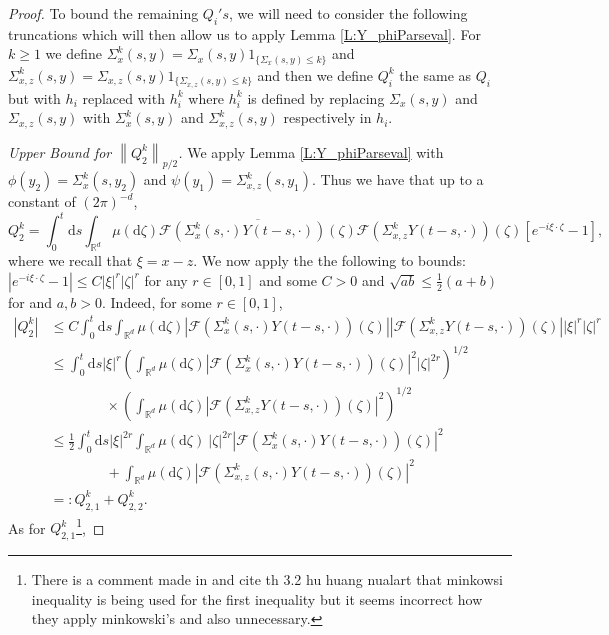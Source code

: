 \documentclass[a4paper,11pt]{article}
\numberwithin{equation}{section}
\theoremstyle{plain}
\theoremstyle{definition}
\newcommand{\ud}{\ensuremath{\mathrm{d} }}
\newcommand{\Norm}[1]{\left\|  #1   \right\|}
\newcommand{\R}{\mathbb{R}}
\numberwithin{NQ}{section}
\numberwithin{LQ}{section}
\numberwithin{ZQ}{section}
\begin{document}
\begin{proof}
To bound the remaining $Q_i's$, we will need to consider the following truncations which will then allow us to apply Lemma \ref{L:Y_phiParseval}. For $k \ge 1$ we define $\Sigma_{x}^k(s,y) = \Sigma_{x}(s,y) 1_{\{\Sigma_{x}(s,y) \le k \}}$ and $\Sigma_{x,z}^k(s,y) = \Sigma_{x,z}(s,y) 1_{\{\Sigma_{x,z}(s,y) \le k \}}$ and then we define $Q_i^k$ the same as $Q_i$ but with $h_i$ replaced with $h_i^k$ where $h_i^k$ is defined by replacing $\Sigma_{x}(s,y) $ and $\Sigma_{x,z}(s,y) $ with $\Sigma_{x}^k(s,y)$ and $\Sigma_{x,z}^k(s,y)$ respectively in $h_i$.

\textit{Upper Bound for $\Norm{Q_2^k}_{p/2}$.} We apply Lemma \ref{L:Y_phiParseval} with $\phi(y_2) = \Sigma_{x}^k(s,y_2)$ and $\psi(y_1) = \Sigma_{x,z}^k(s,y_1)$. Thus we have that up to a constant of $(2\pi)^{-d}$,
	\[
		Q_2^k = \int_0^t \ud s \int_{\R^d} \mu(\ud \zeta) \overline{ \mathcal{F}\left(\Sigma_{x}^k(s,\cdot)Y(t-s,\cdot)\right)(\zeta) }\mathcal{F}\left(\Sigma^k_{x,z} Y(t-s,\cdot)\right)(\zeta)[e^{-i\xi \cdot \zeta}-1],
	\]
where we recall that $\xi = x - z$. We now apply the the following to bounds: $|e^{-i\xi \cdot \zeta}-1| \le C |\xi|^{r} |\zeta|^{r}$ for any $r \in [0,1]$ and some $C>0$ and $\sqrt{ab} \le \frac{1}{2}(a+b)$ for and $a,b > 0$. Indeed, for some $r \in [0,1]$,
	\begin{align*}
		|Q_2^k| & \le C \int_0^t \ud s \int_{\R^d} \mu(\ud \zeta) \left| \mathcal{F}\left(\Sigma_{x}^k(s,\cdot)Y(t-s,\cdot)\right)(\zeta)\right| \left|\mathcal{F}\left(\Sigma^k_{x,z} Y(t-s,\cdot)\right)(\zeta)\right| |\xi|^{r} |\zeta|^{r} \\
		&\le \int_0^t \ud s |\xi|^{r} \left(\int_{\R^d} \mu(\ud \zeta) \left| \mathcal{F}\left(\Sigma_{x}^k(s,\cdot)Y(t-s,\cdot)\right)(\zeta)\right|^2 |\zeta|^{2r} \right)^{1/2} \\
		& \qquad \qquad \times \left( \int_{\R^d} \mu(\ud \zeta)\left|\mathcal{F}\left(\Sigma^k_{x,z} Y(t-s,\cdot)\right)(\zeta)\right|^2 \right)^{1/2} \\
		& \le \frac{1}{2} \int_0^t \ud s |\xi|^{2r} \int_{\R^d} \mu(\ud \zeta) \: |\zeta|^{2r} \left| \mathcal{F}\left(\Sigma_{x}^k(s,\cdot)Y(t-s,\cdot)\right)(\zeta)\right|^2  \\
		& \qquad \qquad + \int_{\R^d} \mu(\ud \zeta)\left|\mathcal{F}\left(\Sigma^k_{x,z}(s,\cdot) Y(t-s,\cdot)\right)(\zeta)\right|^2  \\
		& =: Q^k_{2,1} + Q^k_{2,2}.
	\end{align*}
As for $Q^k_{2,1}$\footnote{There is a comment made in \cite[Proposition 4.8]{SoleMillet2021} and cite th 3.2 hu huang nualart that minkowsi inequality is being used for the first inequality but it seems incorrect how they apply minkowski's and also unnecessary.},

\end{proof}
\end{document}
